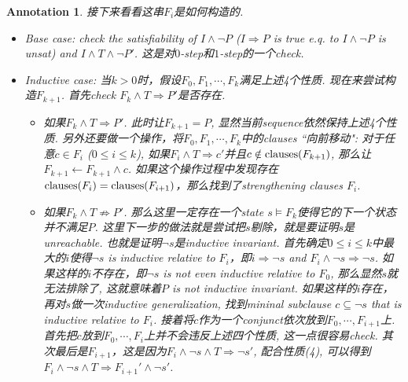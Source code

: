 \documentclass{article}
\newtheorem{annotation}[theorem]{Annotation}
\begin{document}
\begin{annotation}
接下来看看这串$F_i$是如何构造的. 
\begin{itemize}
    \item Base case: check the satisfiability of $I \wedge \neg P$ ($I \Rightarrow P$ is true e.q. to $I \wedge \neg P$ is unsat) and $I \wedge T \wedge \neg P'$. 这是对$0$-step和$1$-step的一个check.
    \item Inductive case: 当$k > 0$时，假设$F_0,F_1,\cdots,F_k$满足上述4个性质. 现在来尝试构造$F_{k+1}$. 首先check $F_k \wedge T \Rightarrow P'$是否存在.
    \begin{itemize}
        \item 如果$F_k \wedge T \Rightarrow P'$. 此时让$F_{k+1} = P$, 显然当前sequence依然保持上述4个性质. 另外还要做一个操作，将$F_0, F_1, \cdots, F_k$中的clauses ``向前移动": 对于任意$c \in F_i$ ($0 \leq i \leq k$), 如果$F_i \wedge T \Rightarrow c'$并且$c \notin \textup{clauses}(F_{k+1})$, 那么让$F_{k+1} \leftarrow F_{k+1} \wedge c$. 如果这个操作过程中发现存在$\textup{clauses}(F_i) = \textup{clauses}(F_{i+1})$，那么找到了strengthening clauses $F_i$.
        \item 如果$F_k \wedge T \nRightarrow P'$. 那么这里一定存在一个state $s \models F_k$使得它的下一个状态并不满足$P$. 这里下一步的做法就是尝试把$s$剔除，就是要证明$s$是unreachable. 也就是证明$\neg s$是inductive invariant. 首先确定$0\leq i \leq k$中最大的$i$使得$\neg s$ is inductive relative to $F_i$，即$i \Rightarrow \neg s$ and $F_i \wedge \neg s \Rightarrow \neg s$. 如果这样的$i$不存在，即$\neg s$ is not even inductive relative to $F_0$, 那么显然$s$就无法排除了, 这就意味着$P$ is not inductive invariant. 如果这样的$i$存在，再对$s$做一次inductive generalization, 找到mininal subclause $c \subseteq \neg s$ that is inductive relative to $F_i$. 接着将$c$作为一个conjunct依次放到$F_0, \cdots, F_{i+1}$上. 首先把$c$放到$F_0, \cdots,F_i$上并不会违反上述四个性质, 这一点很容易check. 其次最后是$F_{i+1}$，这是因为$F_{i} \wedge \neg s \wedge T \Rightarrow \neg s'$, 配合性质(4), 可以得到$F_{i} \wedge \neg s \wedge T \Rightarrow F_{i+1}' \wedge \neg s'$. 
        

\end{itemize}
\end{itemize}
\end{annotation}
\end{document}
